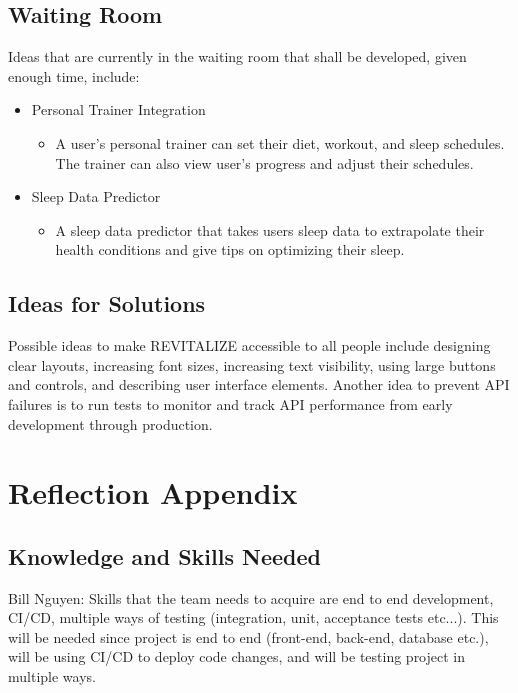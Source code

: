 \documentclass[12pt,letterpaper]{article}
\begin{document}
\subsection{Waiting Room}
Ideas that are currently in the waiting room that shall be developed, given enough time, include:
\begin{itemize}
\item Personal Trainer Integration
\begin{itemize}
	\item A user's personal trainer can set their diet, workout, and sleep schedules. The trainer can also view user's progress and adjust their schedules.
\end{itemize}
\item Sleep Data Predictor
\begin{itemize}
	\item A sleep data predictor that takes users sleep data to extrapolate their health conditions and give tips on optimizing their sleep.
\end{itemize}
\end{itemize}

\subsection{Ideas for Solutions}
Possible ideas to make REVITALIZE accessible to all people include designing clear layouts, increasing font sizes, increasing text visibility, using large buttons and controls, and describing user interface elements. Another idea to prevent API failures is to run tests to monitor and track API performance from early development through production.

\section{Reflection Appendix}

\subsection{Knowledge and Skills Needed}

\noindent Bill Nguyen: Skills that the team needs to acquire are end to end development, CI/CD, multiple ways of testing (integration, unit, acceptance tests etc...). This will be needed since project is end to end (front-end, back-end, database etc.), will be using CI/CD to deploy code changes, and will be testing project in multiple ways.\\
\end{document}
